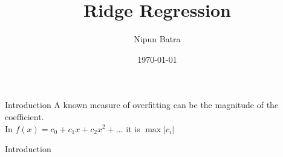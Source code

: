 \documentclass{beamer}
\title{Ridge Regression}
\date{\today}
\author{Nipun Batra}
\institute{IIT Gandhinagar}
\begin{document}
  \maketitle

\begin{frame}{Introduction}
A known measure of overfitting can be the magnitude of the coefficient. \\ \bigskip
\pause
In $f(x) = c_0 + c_1x + c_2x^2 + \dots$ it is $\max|c_i|$ \\ \bigskip
\end{frame}
  
\begin{frame}{Introduction}
\vspace{0.4cm}

\end{frame}
\end{document}
